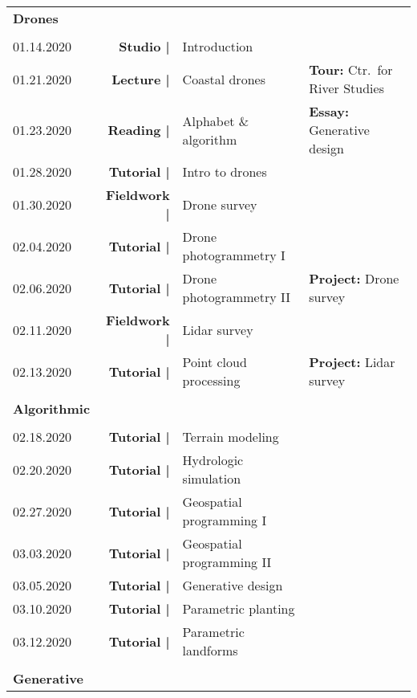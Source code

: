 \documentclass[11pt,article,oneside]{memoir}
\begin{document}
\begin{table}[H]
\begin{tabular}{l r @{\hskip 0.1cm} l @{\hskip 0.4cm} l}
\\
\textbf{Drones}\\
\\
01.14.2020 & \textbf{Studio |} & Introduction \\
%
01.21.2020 & \textbf{Lecture |} & Coastal drones & \textbf{Tour:} Ctr.~for River Studies \\
01.23.2020 & \textbf{Reading |} &Alphabet \& algorithm & \textbf{Essay:} Generative design \\
%
01.28.2020 & \textbf{Tutorial |} & Intro to drones \\
01.30.2020 & \textbf{Fieldwork |} & Drone survey \\
%
02.04.2020 & \textbf{Tutorial |} & Drone photogrammetry I \\
02.06.2020 & \textbf{Tutorial |} & Drone photogrammetry II & \textbf{Project:} Drone survey \\
%
02.11.2020 & \textbf{Fieldwork |} & Lidar survey \\
02.13.2020 & \textbf{Tutorial |} & Point cloud processing & \textbf{Project:} Lidar survey \\
\\
\textbf{Algorithmic}\\
\\
02.18.2020 & \textbf{Tutorial |} & Terrain modeling \\
02.20.2020 & \textbf{Tutorial |} & Hydrologic simulation \\
%
02.27.2020 & \textbf{Tutorial |} & Geospatial programming I\\
%
03.03.2020 & \textbf{Tutorial |} & Geospatial programming II \\
03.05.2020 & \textbf{Tutorial |} & Generative design\\ 
%
03.10.2020 & \textbf{Tutorial |} & Parametric planting \\
03.12.2020 & \textbf{Tutorial |} & Parametric landforms \\%
\\
\textbf{Generative}\\

\end{tabular}
\end{table}
\end{document}

